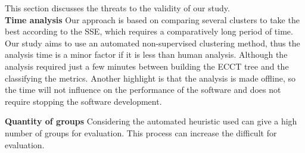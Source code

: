 This section discusses the threats to the validity of our study.\\
\textbf{Time analysis}
    Our approach is based on comparing several clusters to take the best according to the SSE, which requires a comparatively long period of time. Our study aims to use an automated non-supervised clustering method, thus the analysis time is a minor factor if it is less than human analysis. Although the analysis required just a few minutes between building the ECCT tree and the classifying the metrics. Another highlight is that the analysis is made offline, so the time will not influence on the performance of the software and does not require stopping the software development.
    
\textbf{Quantity of groups}
    Considering the automated heuristic used can give a high number of groups for evaluation. This process can increase the difficult for evaluation.